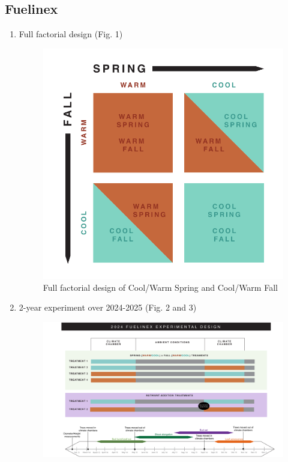 \documentclass{article}
\begin{document}
\subsection{Fuelinex}
\begin {enumerate}
	\item Full factorial design (Fig. 1)
\begin{figure}[p] 
\includegraphics[width=1.1\textwidth]{FullFactorialFigure.pdf} 
\caption{Full factorial design of Cool/Warm Spring and Cool/Warm Fall}
\label{fig:sample}
\end{figure}
	\item 2-year experiment over 2024-2025 (Fig. 2 and 3)
\begin{figure}[p]
\includegraphics[width=1.1\textwidth]{Fuelinex_Design2024.pdf}

\end{figure}
\end{enumerate}
\end{document}
